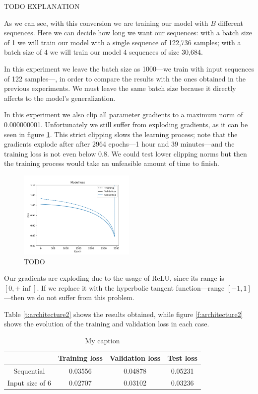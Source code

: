 \documentclass[]{article}
\begin{document}
TODO EXPLANATION

As we can see, with this conversion we are training our model with $ B $ different sequences. Here we can decide how long we want our sequences: with a batch size of 1 we will train our model with a single sequence of 122,736 samples; with a batch size of 4 we will train our model 4 sequences of size 30,684.

In this experiment we leave the batch size as 1000---we train with input sequences of 122 samples---, in order to compare the results with the ones obtained in the previous experiments. We must leave the same batch size because it directly affects to the model’s generalization.

In this experiment we also clip all parameter gradients to a maximum norm of 0.000000001. Unfortunately we still suffer from exploding gradients, as it can be seen in figure \ref{f:architecture1}. This strict clipping slows the learning process; note that the gradients explode after after 2964 epochs---1 hour and 39 minutes---and the training loss is not even below 0.8. We could test lower clipping norms but then the training process would take an unfeasible amount of time to finish.

\begin{figure}[H]
	\centering
	\includegraphics[width=0.5\textwidth]{architecture1}
	\caption{TODO}
	\label{f:architecture1}
\end{figure}

Our gradients are exploding due to the usage of ReLU, since its range is $ [0, +\inf] $. If we replace it with the hyperbolic tangent function---range $ [-1, 1] $---then we do not suffer from this problem.

Table \ref{t:architecture2} shows the results obtained, while figure \ref{f:architecture2} shows the evolution of the training and validation loss in each case.

\begin{table}[H]
	\centering
	\begin{tabular}{@{}cccc@{}}
		\toprule
		& Training loss & Validation loss & Test loss \\ \midrule
		Sequential      & 0.03556       & 0.04878         & 0.05231   \\
		Input size of 6 & 0.02707       & 0.03102         & 0.03236   \\ \bottomrule
	\end{tabular}
	\caption{My caption}
	\label{architecture2}
\end{table}
\end{document}
